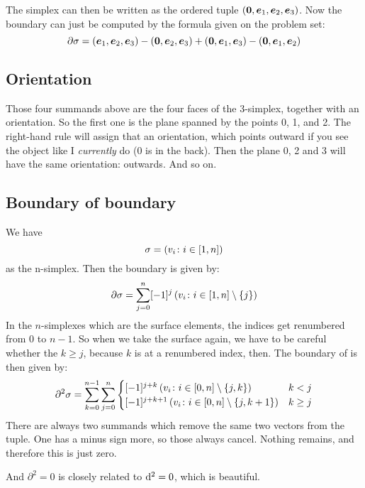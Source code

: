 \documentclass[11pt, english, fleqn, DIV=15, headinclude, BCOR=1cm]{scrartcl}
\begin{document}
The simplex can then be written as the ordered tuple $(\boldsymbol{0}, \boldsymbol{e}_1, \boldsymbol{e}_2,
\boldsymbol{e}_3)$. Now the boundary can just be computed by the formula given on the
problem set:
\[
    \partial \sigma = (\boldsymbol{e}_1, \boldsymbol{e}_2, \boldsymbol{e}_3) - (\boldsymbol{0}, \boldsymbol{e}_2, \boldsymbol{e}_3) + (\boldsymbol{0},
    \boldsymbol{e}_1, \boldsymbol{e}_3) - (\boldsymbol{0}, \boldsymbol{e}_1, \boldsymbol{e}_2)
\]

\subsection{Orientation}

Those four summands above are the four faces of the 3-simplex, together with an
orientation. So the first one is the plane spanned by the points 0, 1, and 2.
The right-hand rule will assign that an orientation, which points outward if
you see the object like I \emph{currently} do (0 is in the back). Then the
plane 0, 2 and 3 will have the same orientation: outwards. And so on.

\subsection{Boundary of boundary}

We have
\[
    \sigma = \left( v_i \colon i \in [1, n] \right)
\]
as the n-simplex. Then the boundary is given by:
\[
    \partial \sigma = \sum_{j = 0}^n [-1]^j
    \left( v_i \colon i \in [1, n] \setminus \{j\} \right)
\]
In the $n$-simplexes which are the surface elements, the indices get
renumbered from 0 to $n-1$. So when we take the surface again, we have to be
careful whether the $k \geq j$, because $k$ is at a renumbered index, then.
The boundary of is then given by:
\[
    \partial^2 \sigma = \sum_{k = 0}^{n-1} \sum_{j = 0}^n
    \begin{cases}
        [-1]^{j+k} \left( v_i \colon i \in [0, n] \setminus \{j, k\} \right) & k < j \\
        [-1]^{j+k+1} \left( v_i \colon i \in [0, n] \setminus \{j, k + 1\} \right) & k \geq j
    \end{cases}
\]
There are always two summands which remove the same two vectors from the tuple.
One has a minus sign more, so those always cancel. Nothing remains, and
therefore this is just zero.

And $\partial^2 = 0$ is closely related to $\mathop{}\!\mathrm d^2 = 0$, which is beautiful.
\end{document}
